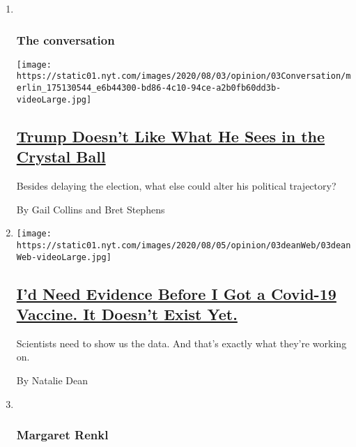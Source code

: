 \begin{enumerate}
\def\labelenumi{\arabic{enumi}.}
\item ~
  \hypertarget{the-conversation}{%
  \subsubsection{The conversation}\label{the-conversation}}

  \texttt{[image: https://static01.nyt.com/images/2020/08/03/opinion/03Conversation/merlin\_175130544\_e6b44300-bd86-4c10-94ce-a2b0fb60dd3b-videoLarge.jpg]}

  \hypertarget{trump-doesnt-like-what-he-sees-in-the-crystal-ball}{%
  \subsection{\texorpdfstring{\href{/2020/08/03/opinion/trump-biden-2020.html}{Trump
  Doesn't Like What He Sees in the Crystal
  Ball}}{Trump Doesn't Like What He Sees in the Crystal Ball}}\label{trump-doesnt-like-what-he-sees-in-the-crystal-ball}}

  Besides delaying the election, what else could alter his political
  trajectory?

  By Gail Collins and Bret Stephens
\item
  \texttt{[image: https://static01.nyt.com/images/2020/08/05/opinion/03deanWeb/03deanWeb-videoLarge.jpg]}

  \hypertarget{id-need-evidence-before-i-got-a-covid-19-vaccine-it-doesnt-exist-yet}{%
  \subsection{\texorpdfstring{\href{/2020/08/03/opinion/coronavirus-vaccine-efficacy-trials.html}{I'd
  Need Evidence Before I Got a Covid-19 Vaccine. It Doesn't Exist
  Yet.}}{I'd Need Evidence Before I Got a Covid-19 Vaccine. It Doesn't Exist Yet.}}\label{id-need-evidence-before-i-got-a-covid-19-vaccine-it-doesnt-exist-yet}}

  Scientists need to show us the data. And that's exactly what they're
  working on.

  By Natalie Dean
\item ~
  \hypertarget{margaret-renkl}{%
  \subsubsection{Margaret Renkl}\label{margaret-renkl}}


\end{enumerate}
